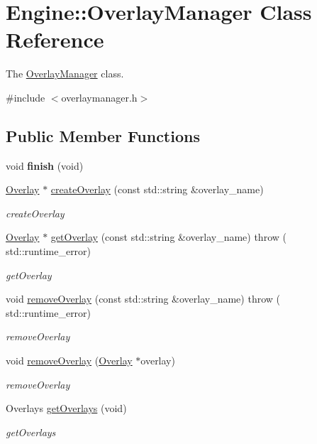 \hypertarget{classEngine_1_1OverlayManager}{}\section{Engine\+:\+:Overlay\+Manager Class Reference}
\label{classEngine_1_1OverlayManager}


The \hyperlink{classEngine_1_1OverlayManager}{Overlay\+Manager} class.  




{\ttfamily \#include $<$overlaymanager.\+h$>$}

\subsection*{Public Member Functions}
\begin{DoxyCompactItemize}
\item 
\hypertarget{classEngine_1_1OverlayManager_a4031a3daa9c8ecafceaf3b3b842f32fa}{}void {\bfseries finish} (void)\label{classEngine_1_1OverlayManager_a4031a3daa9c8ecafceaf3b3b842f32fa}

\item 
\hyperlink{classEngine_1_1Overlay}{Overlay} $\ast$ \hyperlink{classEngine_1_1OverlayManager_a7bba3a6a67c5d5a6f80486b9775c22b7}{create\+Overlay} (const std\+::string \&overlay\+\_\+name)
\begin{DoxyCompactList}\small\item\em create\+Overlay \end{DoxyCompactList}\item 
\hyperlink{classEngine_1_1Overlay}{Overlay} $\ast$ \hyperlink{classEngine_1_1OverlayManager_afee61b9ea8bb3771231d56b0c0a6817c}{get\+Overlay} (const std\+::string \&overlay\+\_\+name)  throw ( std\+::runtime\+\_\+error)
\begin{DoxyCompactList}\small\item\em get\+Overlay \end{DoxyCompactList}\item 
void \hyperlink{classEngine_1_1OverlayManager_a7e8cca44ab6be17f579b4e06152acb50}{remove\+Overlay} (const std\+::string \&overlay\+\_\+name)  throw ( std\+::runtime\+\_\+error)
\begin{DoxyCompactList}\small\item\em remove\+Overlay \end{DoxyCompactList}\item 
void \hyperlink{classEngine_1_1OverlayManager_a9a4a550f2e053b6909d1642d32f877a8}{remove\+Overlay} (\hyperlink{classEngine_1_1Overlay}{Overlay} $\ast$overlay)
\begin{DoxyCompactList}\small\item\em remove\+Overlay \end{DoxyCompactList}\item 
Overlays \hyperlink{classEngine_1_1OverlayManager_ae46ff201f2f790e3fe0c06b563b54e3e}{get\+Overlays} (void)
\begin{DoxyCompactList}\small\item\em get\+Overlays \end{DoxyCompactList}\end{DoxyCompactItemize}
